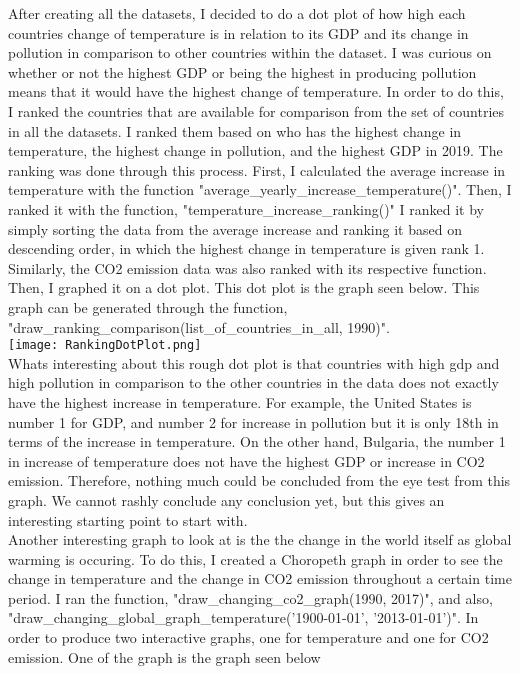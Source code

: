 \documentclass[fontsize=11pt]{article}
\begin{document}
After creating all the datasets, I decided to do a dot plot of how high each countries change of temperature is in relation to its GDP and its change in pollution in comparison to other countries within the dataset. I was curious on whether or not the highest GDP or being the highest in producing pollution means that it would have the highest change of temperature. In order to do this, I ranked the countries that are available for comparison from the set of countries in all the datasets. I ranked them based on who has the highest change in temperature, the highest change in pollution, and the highest GDP in 2019. The ranking was done through this process. First, I calculated the average increase in temperature with the function "average\_yearly\_increase\_temperature()". Then, I ranked it with the function, "temperature\_increase\_ranking()" I ranked it by simply sorting the data from the average increase and ranking it based on descending order, in which the highest change in temperature is given rank 1. Similarly, the CO2 emission data was also ranked with its respective function. Then, I graphed it on a dot plot. This dot plot is the graph seen below. This graph can be generated through the function, "draw\_ranking\_comparison(list\_of\_countries\_in\_all, 1990)".
\\
\texttt{[image: RankingDotPlot.png]}
\\
Whats interesting about this rough dot plot is that countries with high gdp and high pollution in comparison to the other countries in the data does not exactly have the highest increase in temperature. For example, the United States is number 1 for GDP, and number 2 for increase in pollution but  it is only 18th in terms of the increase in temperature. On the other hand, Bulgaria, the number 1 in increase of temperature does not have the highest GDP or increase in CO2 emission. Therefore, nothing much could be concluded from the eye test from this graph. We cannot rashly conclude any conclusion yet, but this gives an interesting starting point to start with. \\
Another interesting graph to look at is the the change in the world itself as global warming is occuring. To do this, I created a Choropeth graph in order to see the change in temperature and the change in CO2 emission throughout a certain time period. I ran the function, "draw\_changing\_co2\_graph(1990, 2017)", and also, "draw\_changing\_global\_graph\_temperature('1900-01-01', '2013-01-01')". In order to produce two interactive graphs, one for temperature and one for CO2 emission. One of the graph is the graph seen below
\end{document}
